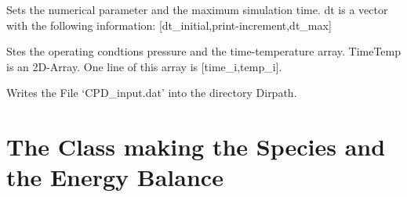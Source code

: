 \documentclass[letterpaper,10pt,english]{sphinxmanual}
\begin{document}
\begin{fulllineitems}
\begin{fulllineitems}
\end{fulllineitems}


\begin{fulllineitems}
\label{CPDClasses:CPD_SetAndLaunch.SetterAndLauncher.SetNumericalParam}
Sets the numerical parameter and the maximum simulation time. dt is a vector with the following information: {[}dt\_initial,print-increment,dt\_max{]}

\end{fulllineitems}


\begin{fulllineitems}
\label{CPDClasses:CPD_SetAndLaunch.SetterAndLauncher.SetOperateCond}
Stes the operating condtions pressure and the time-temperature array. TimeTemp is an 2D-Array. One line of this array is {[}time\_i,temp\_i{]}.

\end{fulllineitems}


\begin{fulllineitems}
\label{CPDClasses:CPD_SetAndLaunch.SetterAndLauncher.writeInstructFile}
Writes the File `CPD\_input.dat' into the directory Dirpath.

\end{fulllineitems}


\end{fulllineitems}



\section{The Class making the Species and the Energy Balance}
\label{CPDClasses:the-class-making-the-species-and-the-energy-balance}
\end{document}

